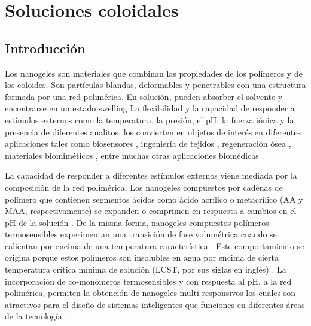 \chapter{Soluciones coloidales} \label{chapter:mc:soluciones}
	
	\section{Introducci\'on}
	
	Los nanogeles son materiales que combinan las propiedades de los pol\'imeros y de los coloides. Son part\'iculas blandas, deformables y penetrables con una estructura formada por una red polim\'erica. \cite{lyon2012polymer} En soluci\'on, pueden absorber el solvente y encontrarse en un estado swelling \cite{karg2019nanogels,perez2021thermodynamic}
	La flexibilidad y la capacidad de responder a est\'imulos externos como la temperatura, la presi\'on, el pH, la fuerza i\'onica y la presencia de diferentes analitos, los convierten en objetos de inter\'es en diferentes aplicaciones tales como biosensores \cite{zhang2012ultrathin,islam2014responsive}, ingenier\'ia de tejidos \cite{matricardi2013interpenetrating,van2011biopolymer}, regeneraci\'on \'osea \cite{bai2018bioactive}, materiales biomim\'eticos \cite{green2016mimicking,wu2010multifunctional}, entre muchas otras aplicaciones biom\'edicas \cite{Daly2020}. 
	
	La capacidad de responder a diferentes est\'imulos externos viene mediada por la composici\'on de la red polim\'erica.
	Los nanogeles compuestos por cadenas de pol\'imero que contienen segmentos \'acidos como \'acido acr\'ilico o metacr\'ilico (AA y MAA, respectivamente) se expanden o comprimen  en respuesta a cambios en el pH de la soluci\'on \cite{snowden1996colloidal,Zhou1998}.
	De la misma forma, nanogeles compuestos pol\'imeros termosensibles experimentan una transici\'on de fase volum\'etrica cuando se calientan por encima de una temperatura caracter\'istica \cite{Pelton1986,Pelton2000}.
	Este comportamiento se origina porque estos pol\'imeros son insolubles en agua por encima de cierta temperatura cr\'itica m\'inima  de soluci\'on (LCST, por sus siglas en ingl\'es) \cite{Kawaguchi2020}.
	La incorporaci\'on de co-mon\'omeros termosensibles y con respuesta al pH, a la red polim\'erica,  permiten la obtenci\'on de nanogeles multi-responsivos los cuales son atractivos para el dise\~no de sistemas inteligentes que funciones en diferentes \'areas de la tecnolog\'ia \cite{plamper2017functional}.	
	
